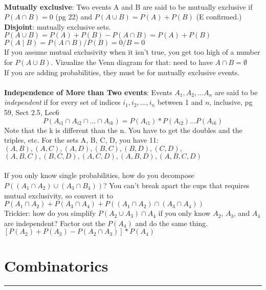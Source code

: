 \hfill \\
\textbf{Mutually exclusive}: Two events A and B are said to be mutually exclusive if $P(A \cap B) = 0$ {\tiny (pg 22)} and $P(A \cup B) = P(A) + P(B)$  {\tiny (E confirmed.)}
\textbf{Disjoint}: mutually exclusive sets. \hfill \\
$P(A \cup B) = P(A) + P(B) - P(A \cap B) = P(A) + P(B) $ \hfill \\
$P(A \mid B) = P(A \cap B)/P(B) = 0/B = 0 $ \hfill \\
If you assume mutual exclusivity when it isn't true, you get too high of a number for $P(A \cup B)$.  Vizualize the Venn diagram for that: need to have $A \cap B = \emptyset$ \hfill \\
If you are adding probabilities, they must be for mutually exclusive events. \hfill \\

\hfill \\
\textbf{Independence of More than Two events}:
Events $A_1, A_2, \dots  A_n$ are said to be \textit{independent} if for every set of indices $i_1, i_2, \dots, i_n$ between 1 and $n$, inclusive,  {\tiny pg 59, Sect 2.5, Lec6}
	\[ P(A_{i1} \cap A_{i2} \cap \dots \cap A_{ik}) = P(A_{i1})*P(A_{i2}) \dots P(A_{ik}) \]
Note that the k is different than the n.  You have to get the doubles and the triples, etc. 
For the sets A, B, C, D, you have 11: $(A, B), (A, C), (A, D), (B, C), (B, D), (C, D),$ \\
$(A, B, C), (B, C, D), (A, C, D), (A, B, D), (A, B, C, D)$ \hfill \\

\hfill \\

If you only know single probabilities, how do you decompose $P((A_1 \cap A_2) \cup (A_3 \cap B_4))$?  You can't break apart the cups {\tiny that requires mutual exclusivity}, so convert it to $P(A_1 \cap A_2) + P(A_3 \cap A_4) + P((A_1 \cap A_2) \cap (A_3 \cap A_4))$ \hfill \\

Trickier: how do you simplify $P(A_2 \cup A_3) \cap A_4 $ if you only know $A_2$, $A_3$, and $A_4$ are independent?  Factor out the $P(A_4)$ and do the same thing. $[P(A_2) + P(A_3) - P(A_2 \cap A_3)]*P(A_4)$

\section{Combinatorics}
\smallskip \hrule height 2pt \smallskip

